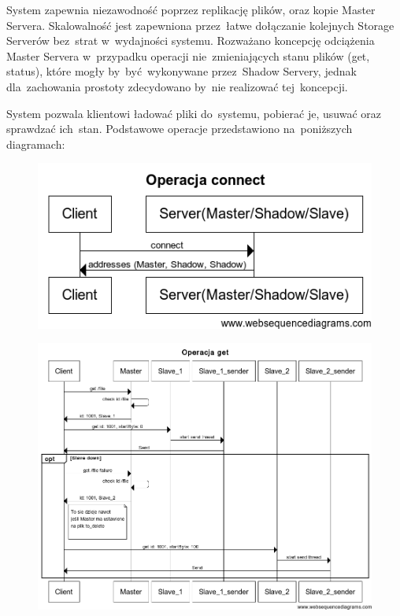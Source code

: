 \vspace{5mm}
System zapewnia niezawodność poprzez replikację plików, oraz kopie Master
Servera. Skalowalność jest zapewniona przez~łatwe dołączanie kolejnych Storage
Serverów bez~strat w~wydajności systemu. Rozważano koncepcję odciążenia Master
Servera w~przypadku operacji nie~zmieniających stanu plików (get, status),
które mogły by~być~wykonywane przez~Shadow Servery, jednak dla~zachowania
prostoty zdecydowano by~nie realizować tej~koncepcji.

\vspace{5mm}
System pozwala klientowi ładować pliki do~systemu, pobierać je, usuwać oraz
sprawdzać ich~stan. Podstawowe operacje przedstawiono na~poniższych diagramach:

\begin{figure}[H]
\center
\flushleft
\includegraphics[keepaspectratio=true, scale=0.5]{img/connect_op.png}
\end{figure}

\begin{figure}[H]
\center
\flushleft
\includegraphics[keepaspectratio=true, scale=0.47]{img/get_op.png}
\end{figure}

